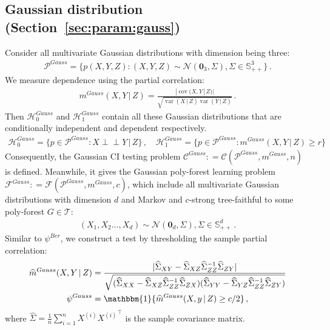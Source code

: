 \documentclass{article}
\theoremstyle{definition}
\theoremstyle{definition}
\theoremstyle{definition}
\theoremstyle{definition}
\theoremstyle{definition}
\theoremstyle{definition}
\theoremstyle{remark}
\theoremstyle{remark}
\DeclareMathOperator{\cov}{cov}
\DeclareMathOperator{\var}{var}
\newcommand{\given}{\,|\,}
\newcommand{\indep}{\perp \!\!\! \perp }
\newcommand{\T}{^\top}
\newcommand{\pltr}{\mathcal{T}}
\newcommand{\dpdm}{m}
\newcommand{\dd}{d}
\newcommand{\ciclass}{\mathcal{C}}
\newcommand{\pfclass}{\mathcal{F}}
\newcommand{\hone}{\mathcal{H}_1}
\newcommand{\hzero}{\mathcal{H}_0}
\begin{document}
\subsection{Gaussian distribution (Section~\ref{sec:param:gauss})}\label{app:details:gauss}
Consider all multivariate Gaussian distributions with dimension being three:
\begin{align*}
    \mathcal{P}^{Gauss} = \bigg\{ p(X,Y,Z): (X,Y,Z) \sim \mathcal{N}(\mathbf{0}_3, \Sigma) , \Sigma\in \mathbb{S}_{++}^3 \bigg\} \,.
\end{align*}
We measure dependence using the partial correlation:
\begin{align}\label{eq:gauss:m}
    \dpdm^{Gauss}(X,Y\given Z) = \frac{|\cov(X,Y\given Z)|}{\sqrt{\var(X\given Z)\var(Y\given Z)}} \,.
\end{align}
Then $\hzero^{Gauss}$ and $\hone^{Gauss}$ contain all these Gaussian distributions that are conditionally independent and dependent respectively.
\begin{align*}
    \hzero^{Gauss} = \{p\in \mathcal{P}^{Gauss}: X\indep Y\given Z\}\,, \quad \hone^{Gauss} = \{p\in \mathcal{P}^{Gauss}: \dpdm^{Gauss}(X,Y\given Z) \ge r\}
\end{align*}
Consequently, the Gaussian CI testing problem $\ciclass^{Gauss}: = \ciclass(\mathcal{P}^{Gauss},\dpdm^{Gauss},n)$ is defined. Meanwhile, it gives the Gaussian poly-forest learning problem $\pfclass^{Gauss}: = \pfclass(\mathcal{P}^{Gauss},\dpdm^{Gauss},c)$, which include all multivariate Gaussian distributions with dimension $\dd$ and Markov and $c$-strong tree-faithful to some poly-forest $G\in \pltr$:
\begin{align*}
    (X_1,X_2\ldots,X_\dd) \sim \mathcal{N}(\mathbf{0}_\dd, \Sigma) , \Sigma\in \mathbb{S}_{++}^\dd\,.
\end{align*}
Similar to $\psi^{Ber}$, we construct a test by thresholding the sample partial correlation:
\begin{align}\label{eq:gauss:test}
\begin{aligned}
    \widehat{\dpdm}^{Gauss}(X,Y\given Z) & =  \frac{|\widehat{\Sigma}_{XY} - \widehat{\Sigma}_{XZ}\widehat{\Sigma}_{ZZ}^{-1}\widehat{\Sigma}_{ZY}|}{\sqrt{(\widehat{\Sigma}_{XX}-\widehat{\Sigma}_{XZ}\widehat{\Sigma}_{ZZ}^{-1}\widehat{\Sigma}_{ZX})(\widehat{\Sigma}_{YY} - \widehat{\Sigma}_{YZ}\widehat{\Sigma}_{ZZ}^{-1}\widehat{\Sigma}_{ZY})}}\\
    \psi^{Gauss} & = \mathbbm{1}\{\widehat{\dpdm}^{Gauss}(X,y\given Z) \ge c/2\} \,,
\end{aligned}
\end{align}
where $\widehat{\Sigma} =  \frac{1}{n}\sum_{i=1}^n X^{(i)}{X^{(i)}}\T$ is the sample covariance matrix. 
\end{document}
